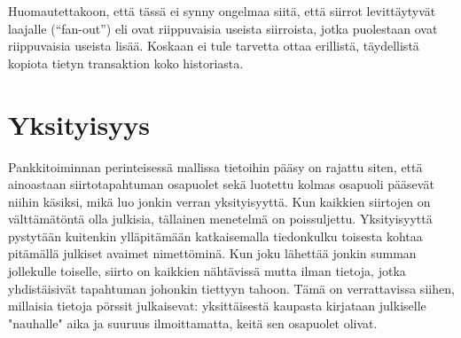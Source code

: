 \documentclass{article}
\begin{document}
Huomautettakoon, että tässä ei synny ongelmaa siitä, että siirrot le\-vit\-täy\-ty\-vät  laajalle (“fan-out”) eli ovat riippuvaisia useista siirroista, jotka puolestaan ovat riippuvaisia useista lisää. Koskaan ei tule tarvetta ottaa erillistä, täydellistä kopiota tietyn transaktion koko historiasta.

\section{Yksityisyys}

Pankkitoiminnan perinteisessä mallissa tietoihin pääsy on rajattu siten, että ainoastaan siirtotapahtuman osapuolet sekä luotettu kolmas osapuoli pääsevät niihin käsiksi, mikä luo jonkin verran yksityisyyttä. Kun kaikkien siirtojen on välttämätöntä olla julkisia, tällainen menetelmä on poissuljettu. Yksityisyyttä pystytään kuitenkin ylläpitämään katkaisemalla tiedonkulku toisesta kohtaa pitämällä julkiset avaimet nimettöminä. Kun joku lähettää jonkin summan jollekulle toiselle, siirto on kaikkien nähtävissä mutta ilman tietoja, jotka yhdistäisivät tapahtuman johonkin tiettyyn tahoon. Tämä on verrattavissa siihen, millaisia tietoja pörssit julkaisevat: yksittäisestä kaupasta kirjataan julkiselle "nauhalle" aika ja suuruus ilmoittamatta, keitä sen osapuolet olivat.
\end{document}
